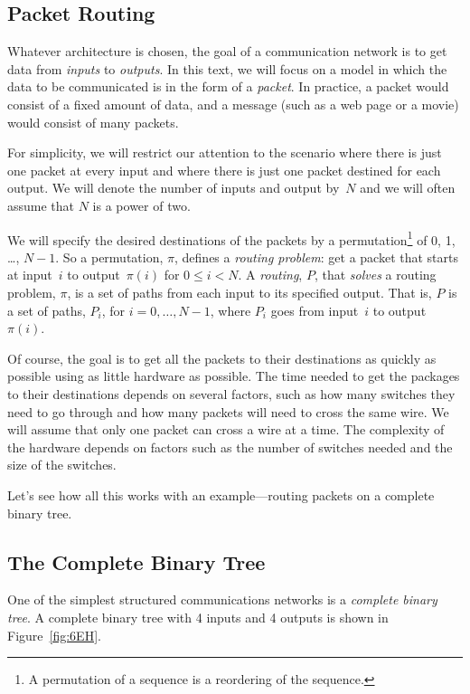 \subsection{Packet Routing}

Whatever architecture is chosen, the goal of a communication network
is to get data from \emph{inputs} to \emph{outputs}.  In this text, we
will focus on a model in which the data to be communicated is in the
form of a \emph{packet}.  In practice, a packet would consist of a
fixed amount of data, and a message (such as a web page or a movie)
would consist of many packets.

For simplicity, we will restrict our attention to the scenario where
there is just one packet at every input and where there is just one
packet destined for each output.  We will denote the number of inputs
and output by~$N$ and we will often assume that $N$ is a power of two.

We will specify the desired destinations of the packets by a
permutation\footnote{A permutation of a sequence is a reordering of
  the sequence.} of 0, 1, \dots, $N - 1$.  So a permutation, $\pi$,
defines a \emph{routing problem}: get a packet that starts at
input~$i$ to output~$\pi(i)$ for $0 \le i < N$.  A \emph{routing},
$P$, that \emph{solves} a routing problem, $\pi$, is a set of paths
from each input to its specified output.  That is, $P$ is a set of
paths, $P_i$, for $i = 0, \dots, N - 1$, where $P_i$ goes from
input~$i$ to output~$\pi(i)$.

Of course, the goal is to get all the packets to their destinations as
quickly as possible using as little hardware as possible.  The time
needed to get the packages to their destinations depends on several
factors, such as how many switches they need to go through and how
many packets will need to cross the same wire.  We will assume that
only one packet can cross a wire at a time.  The complexity of the
hardware depends on factors such as the number of switches needed and
the size of the switches.

Let's see how all this works with an example---routing packets on a
complete binary tree.

\subsection{The Complete Binary Tree}

One of the simplest structured communications networks is a
\emph{complete binary tree}.  A complete binary tree with 4 inputs and
4 outputs is shown in Figure~\ref{fig:6EH}.

